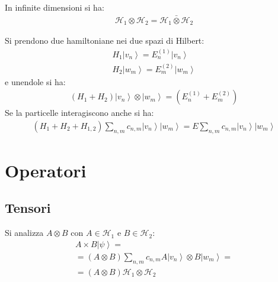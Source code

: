 In infinite dimensioni si ha:
\begin{equation}\begin{split}
\mathcal{H}_1\otimes\mathcal{H}_2=\bar {\mathcal{H}_1\otimes\mathcal{H}_2}
\end{split}\end{equation}


Si prendono due hamiltoniane nei due spazi di Hilbert:
\begin{equation}\begin{split}
H_1\left |v_n \right\rangle=E_n^{\left(1\right)}\left |v_n \right\rangle \\
H_2\left |w_m \right\rangle=E_m^{\left(2\right)}\left |w_m \right\rangle
\end{split}\end{equation}
e unendole si ha:
\begin{equation}\begin{split}
\left(H_1+H_2\right)\left |v_n \right\rangle\otimes\left |w_m \right\rangle=\left(E_n^{\left(1\right)}+E_m^{\left(2\right)}\right)
\end{split}\end{equation}
Se la particelle interagiscono anche si ha:
\begin{equation}\begin{split}
\left(H_1+H_2+H_{1,2}\right)\sum_{n,m}{c_{n,m}\left |v_n \right\rangle\left |w_m \right\rangle}=E\sum_{n,m}{c_{n,m}\left |v_n \right\rangle\left |w_m \right\rangle}
\end{split}\end{equation}

\section{Operatori} %
\subsection{Tensori} %
Si analizza $A\otimes B$ con $A\in\mathcal{H}_1$ e $B\in\mathcal{H}_2$:
\begin{equation}\begin{split}
A\times B\left |\psi  \right\rangle=\\
=\left(A\otimes B\right)\sum_{n,m}{c_{n,m}A\left |v_n \right\rangle\otimes B\left |w_m \right\rangle}=\\
=\left(A\otimes B\right)\mathcal{H}_1\otimes\mathcal{H}_2
\end{split}\end{equation}

